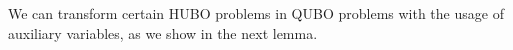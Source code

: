 





We can transform certain HUBO problems in QUBO problems with the usage of auxiliary variables, as we show in the next lemma.

